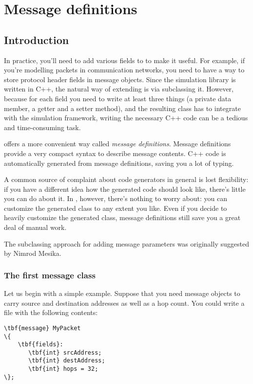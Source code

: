 \section{Message definitions}
\label{ch:messages:message-definitions}

\subsection{Introduction}

In practice, you'll need to add various fields to  to
make it useful. For example, if you're modelling packets in communication
networks, you need to have a way to store protocol header fields in message
objects. Since the simulation library is written in C++, the natural way
of extending  is via subclassing it.
However, because for each field you need to write at least
three things (a private data member, a getter and a setter method),
and the resulting class has to integrate with the simulation framework,
writing the necessary C++ code can be a tedious and time-consuming task.

{\opp} offers a more convenient way called \textit{message definitions}.
Message definitions provide a very compact syntax to describe
message contents. C++ code is automatically generated from message
definitions, saving you a lot of typing.

A common source of complaint about code generators in general is
lost flexibility: if you have a different idea how the generated
code should look like, there's little you can do about it.
In {\opp}, however, there's nothing to worry about: you can
customize the generated class to any extent you like.
Even if you decide to heavily customize the generated class,
message definitions still save you a great deal of manual work.

The subclassing approach for adding message parameters was originally
suggested by Nimrod Mesika.


\subsubsection{The first message class}

Let us begin with a simple example. Suppose that you need message objects to
carry source and destination addresses as well as a hop count. You could write
a  file with the following contents:

\begin{Verbatim}[commandchars=\\\{\}]
\tbf{message} MyPacket
\{
    \tbf{fields}:
       \tbf{int} srcAddress;
       \tbf{int} destAddress;
       \tbf{int} hops = 32;
\};
\end{Verbatim}

